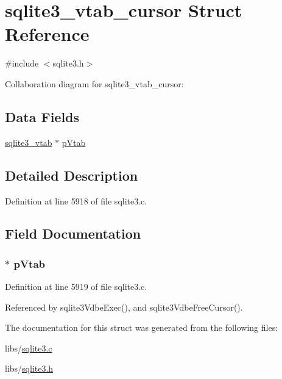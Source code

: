 \hypertarget{structsqlite3__vtab__cursor}{}\section{sqlite3\+\_\+vtab\+\_\+cursor Struct Reference}
\label{structsqlite3__vtab__cursor}


{\ttfamily \#include $<$sqlite3.\+h$>$}



Collaboration diagram for sqlite3\+\_\+vtab\+\_\+cursor\+:
\subsection*{Data Fields}
\begin{DoxyCompactItemize}
\item 
\hyperlink{structsqlite3__vtab}{sqlite3\+\_\+vtab} $\ast$ \hyperlink{structsqlite3__vtab__cursor_a223f809d69fa0203cd008c9d93218405}{p\+Vtab}
\end{DoxyCompactItemize}


\subsection{Detailed Description}


Definition at line 5918 of file sqlite3.\+c.



\subsection{Field Documentation}
\hypertarget{structsqlite3__vtab__cursor_a223f809d69fa0203cd008c9d93218405}{}
\subsubsection[{p\+Vtab}]{ $\ast$ p\+Vtab}\label{structsqlite3__vtab__cursor_a223f809d69fa0203cd008c9d93218405}


Definition at line 5919 of file sqlite3.\+c.



Referenced by sqlite3\+Vdbe\+Exec(), and sqlite3\+Vdbe\+Free\+Cursor().



The documentation for this struct was generated from the following files\+:\begin{DoxyCompactItemize}
\item 
libs/\hyperlink{sqlite3_8c}{sqlite3.\+c}\item 
libs/\hyperlink{sqlite3_8h}{sqlite3.\+h}\end{DoxyCompactItemize}
